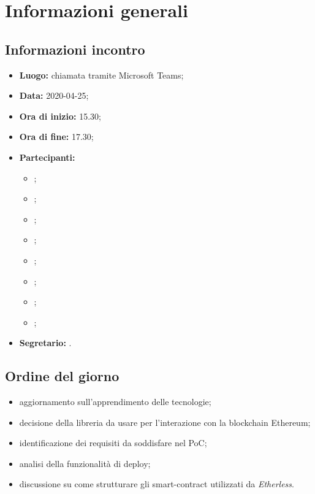 \section{Informazioni generali}
\subsection{Informazioni incontro}
\begin{itemize}
	\item \textbf{Luogo:} chiamata tramite Microsoft Teams; 
	\item \textbf{Data:} 2020-04-25;
	\item \textbf{Ora di inizio:} 15.30; 
	\item \textbf{Ora di fine:} 17.30; 
	\item \textbf{Partecipanti:}
		\begin{itemize}
			\item \VB; 
			\item \LB; 
			\item \NF; 
			\item \EG; 
			\item \FJ; 
			\item \MP; 
			\item \AS; 
			\item \AZ; 
		\end{itemize}
	\item \textbf{Segretario:} \EG. 
\end{itemize}

\subsection{Ordine del giorno}
\begin{itemize}
	\item aggiornamento sull'apprendimento delle tecnologie; 
	\item decisione della libreria da usare per l'interazione con la blockchain Ethereum; 
	\item identificazione dei requisiti da soddisfare nel PoC; 
	\item analisi della funzionalità di deploy;
	\item discussione su come strutturare gli smart-contract utilizzati da \textit{Etherless}.
\end{itemize}
